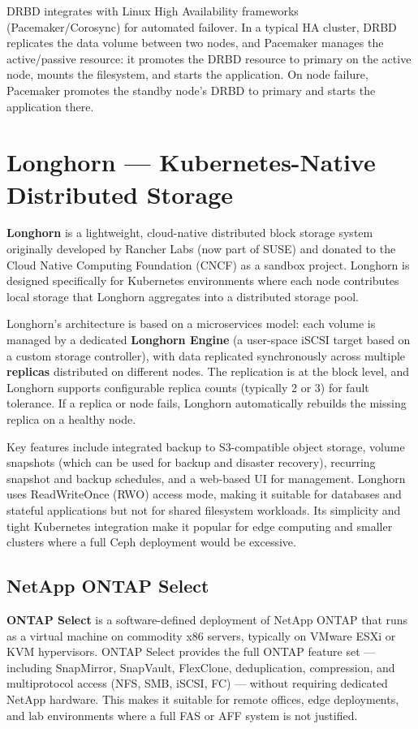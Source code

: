DRBD integrates with Linux High Availability frameworks (Pacemaker/Corosync) for automated failover. In a typical HA cluster, DRBD replicates the data volume between two nodes, and Pacemaker manages the active/passive resource: it promotes the DRBD resource to primary on the active node, mounts the filesystem, and starts the application. On node failure, Pacemaker promotes the standby node's DRBD to primary and starts the application there.

\section{Longhorn --- Kubernetes-Native Distributed Storage}

\textbf{Longhorn} is a lightweight, cloud-native distributed block storage system originally developed by Rancher Labs (now part of SUSE) and donated to the Cloud Native Computing Foundation (CNCF) as a sandbox project. Longhorn is designed specifically for Kubernetes environments where each node contributes local storage that Longhorn aggregates into a distributed storage pool.

Longhorn's architecture is based on a microservices model: each volume is managed by a dedicated \textbf{Longhorn Engine} (a user-space iSCSI target based on a custom storage controller), with data replicated synchronously across multiple \textbf{replicas} distributed on different nodes. The replication is at the block level, and Longhorn supports configurable replica counts (typically 2 or 3) for fault tolerance. If a replica or node fails, Longhorn automatically rebuilds the missing replica on a healthy node.

Key features include integrated backup to S3-compatible object storage, volume snapshots (which can be used for backup and disaster recovery), recurring snapshot and backup schedules, and a web-based UI for management. Longhorn uses ReadWriteOnce (RWO) access mode, making it suitable for databases and stateful applications but not for shared filesystem workloads. Its simplicity and tight Kubernetes integration make it popular for edge computing and smaller clusters where a full Ceph deployment would be excessive.


\subsection{NetApp ONTAP Select}

\textbf{ONTAP Select} is a software-defined deployment of NetApp ONTAP that runs as a virtual machine on commodity x86 servers, typically on VMware ESXi or KVM hypervisors. ONTAP Select provides the full ONTAP feature set --- including SnapMirror, SnapVault, FlexClone, deduplication, compression, and multiprotocol access (NFS, SMB, iSCSI, FC) --- without requiring dedicated NetApp hardware. This makes it suitable for remote offices, edge deployments, and lab environments where a full FAS or AFF system is not justified.

